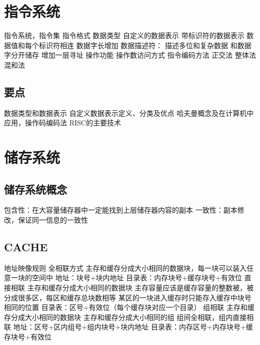 \documentclass{ctexart}
\begin{document}
\section{指令系统}
\begin{outline}
    \1 指令系统，指令集
        \2 指令格式
        \2 数据类型
            \3 自定义的数据表示
            \3 带标识符的数据表示
                \4 数据值和每个标识符相连
                \4 数据字长增加
            \3 数据描述符：
                \4 描述多位和复杂数据
                \4 和数据字分开储存
                \4 增加一层寻址
        \2 操作功能
        \2 操作数访问方式
    \1 指令编码方法
        \2 正交法
        \2 整体法
        \2 混和法
\end{outline}
\subsection{要点}
\begin{outline}
    \heiti
    \1   数据类型和数据表示
    \1   自定义数据表示定义、分类及优点
    \1   哈夫曼概念及在计算机中应用，操作码编码法 
    \1   RISC的主要技术 
\end{outline}
\section{储存系统}
\subsection{储存系统概念}
\begin{outline}
    \1 包含性：在大容量储存器中一定能找到上层储存器内容的副本
    \1 一致性：副本修改，保证同一信息的一致性
\end{outline}
\subsection{CACHE}
\begin{outline}
    \1 地址映像规则
        \2 全相联方式
            \3 主存和缓存分成大小相同的数据块，每一块可以装入任意一块的空间中
            \3 地址：块号+块内地址
            \3 目录表：内存块号+缓存块号+有效位
        \2 直接相联
            \3 主存和缓存分成大小相同的数据块
            \3 主存容量应该是缓存容量的整数被，被分成很多区，每区和缓存总块数相等
            \3 某区的一块进入缓存时只能存入缓存中块号相同的位置
            \3 目录表：区号+有效位（每个缓存块对应一个目录）
        \2 组相联
            \3 主存和缓存分成大小相同的数据块
            \3 主存和缓存分成大小相同的组
            \3 组间全相联，组内直接相联
            \3 地址：区号+区内组号+组内块号+块内地址
            \3 目录表：内存区号+内存块号+缓存块号+有效位
\end{outline}
\end{document}
